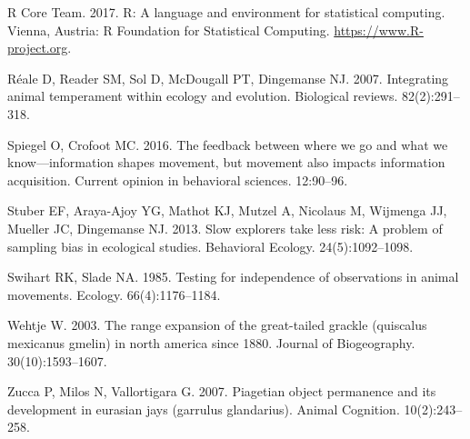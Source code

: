 \documentclass[
]{article}
\begin{document}
\leavevmode\hypertarget{ref-rcoreteam}{}%
R Core Team. 2017. R: A language and environment for statistical
computing. Vienna, Austria: R Foundation for Statistical Computing.
\url{https://www.R-project.org}.

\leavevmode\hypertarget{ref-reale2007integrating}{}%
Réale D, Reader SM, Sol D, McDougall PT, Dingemanse NJ. 2007.
Integrating animal temperament within ecology and evolution. Biological
reviews. 82(2):291--318.

\leavevmode\hypertarget{ref-spiegel2016feedback}{}%
Spiegel O, Crofoot MC. 2016. The feedback between where we go and what
we know---information shapes movement, but movement also impacts
information acquisition. Current opinion in behavioral sciences.
12:90--96.

\leavevmode\hypertarget{ref-stuber2013slow}{}%
Stuber EF, Araya-Ajoy YG, Mathot KJ, Mutzel A, Nicolaus M, Wijmenga JJ,
Mueller JC, Dingemanse NJ. 2013. Slow explorers take less risk: A
problem of sampling bias in ecological studies. Behavioral Ecology.
24(5):1092--1098.

\leavevmode\hypertarget{ref-swihart1985testing}{}%
Swihart RK, Slade NA. 1985. Testing for independence of observations in
animal movements. Ecology. 66(4):1176--1184.

\leavevmode\hypertarget{ref-wehtje2003range}{}%
Wehtje W. 2003. The range expansion of the great-tailed grackle
(quiscalus mexicanus gmelin) in north america since 1880. Journal of
Biogeography. 30(10):1593--1607.

\leavevmode\hypertarget{ref-zucca2007piagetian}{}%
Zucca P, Milos N, Vallortigara G. 2007. Piagetian object permanence and
its development in eurasian jays (garrulus glandarius). Animal
Cognition. 10(2):243--258.
\end{document}

